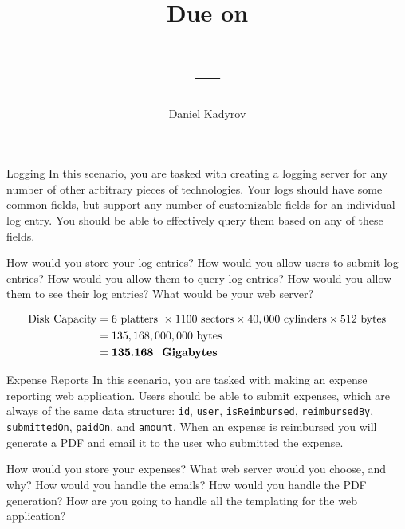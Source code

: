 \documentclass{homework}
\title{
    \Title \\
    \vspace{2mm}
    \large
    Due on \DueDate \\
    \ClassName \\ 
    \ClassNumber ---\ClassSection \\
    \Instructor
}
\author{Daniel Kadyrov}
\date{}
\begin{document}
\maketitle
\thispagestyle{empty}

\begin{problem}[1]{Logging}
    In this scenario, you are tasked with creating a logging server for any number of other arbitrary pieces of technologies. Your logs should have some common fields, but support any number of customizable fields for an individual log entry. You should be able to effectively query them based on any of these fields.

    \vskip 1mm

    How would you store your log entries? How would you allow users to submit log entries? How would you allow them to query log entries? How would you allow them to see their log entries? What would be your web server?
\end{problem}

\begin{solution}
    \[
        \begin{split}
        \text{Disk Capacity} & = 6 \text{ platters } \times 1100 \text{ sectors} \times 40,000 \text{ cylinders} \times 512 \text{ bytes} \\
        &  = 135,168,000,000 \text{ bytes} \\
        &  = \textbf{135.168 \text{ Gigabytes}}
        \end{split}
    \]
\end{solution}

\newpage
\begin{problem}[2]{Expense Reports}
    In this scenario, you are tasked with making an expense reporting web application. Users should be able to submit expenses, which are always of the same data structure: \texttt{id}, \texttt{user}, \texttt{isReimbursed}, \texttt{reimbursedBy}, \texttt{submittedOn}, \texttt{paidOn}, and \texttt{amount}. When an expense is reimbursed you will generate a PDF and email it to the user who submitted the expense. 
    
    \vskip 1mm

    How would you store your expenses? What web server would you choose, and why? How would you handle the emails? How would you handle the PDF generation? How are you going to handle all the templating for the web application?
\end{problem}
\end{document}
